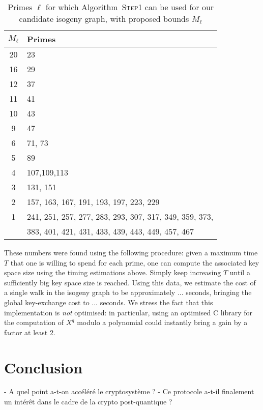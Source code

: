 \documentclass{article}
\newcommand{\algstyle}[1]{\textsc{#1}}
\theoremstyle{definition}
\begin{document}
\begin{table}
\begin{tabular}{cl}
$M_\ell$ & Primes \\
\hline
20 & 23  \\
16 & 29  \\
12 & 37  \\
11 & 41  \\
10 & 43  \\
9  & 47  \\
6  & 71, 73  \\
5  & 89  \\
4  & 107,109,113  \\
3  & 131, 151  \\
2  & 157, 163, 167, 191,
     193,
     197,
     223,
     229  \\
1 &  241,
     251,
     257,
     277,
     283,
     293,
     307,
     317,
     349,
     359,
     373,
	\\ &
     383,
     401,
     421,
     431,
     433,
     439,
     443,
     449,
     457,
     467 \\
\end{tabular}
    \caption{Primes $\ell$ for which Algorithm~\algstyle{Step1} can be
    used for our candidate isogeny graph, with proposed bounds $M_\ell$}
    \label{tab:step1s}
\end{table}


These numbers were found using the following procedure: given a maximum time
$T$ that one is willing to spend for each prime, one can compute the
associated key space size using the timing estimations above. Simply keep
increasing $T$ until a sufficiently big key space size is reached.
Using this data, we estimate the cost of a single walk in the
isogeny graph to be approximately ... seconds, bringing the global
key-exchange cost to ... seconds. We stress the fact that this implementation
is \emph{not} optimised: in particular, using an optimised C library
for the computation of $X^q$ modulo a polynomial could instantly bring a
gain by a factor at least 2.


\section{Conclusion}

- A quel point a-t-on accéléré le cryptosystème ?
- Ce protocole a-t-il finalement un intérêt dans le cadre de la crypto post-quantique ?




\end{document}
